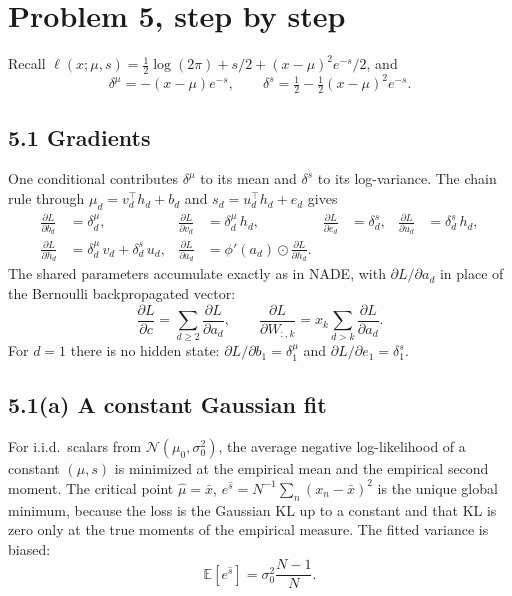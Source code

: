 \documentclass[11pt]{article}
\theoremstyle{remark}
\newcommand{\E}{\mathbb{E}}
\newcommand{\N}{\mathcal{N}}
\begin{document}
\newpage
\section{Problem 5, step by step}

Recall \(\ell(x;\mu,s)=\tfrac12\log(2\pi)+s/2+(x-\mu)^2 e^{-s}/2\), and
\[
\delta^\mu=-(x-\mu)e^{-s},\qquad
\delta^s=\tfrac12-\tfrac12(x-\mu)^2 e^{-s}.
\]

\subsection*{5.1 Gradients}

One conditional contributes \(\delta^\mu\) to its mean and \(\delta^s\) to its log-variance. The chain rule through \(\mu_d=v_d^\top h_d+b_d\) and \(s_d=u_d^\top h_d+e_d\) gives
\begin{align*}
\frac{\partial L}{\partial b_d}&=\delta^\mu_d, &
\frac{\partial L}{\partial v_d}&=\delta^\mu_d\,h_d, &
\frac{\partial L}{\partial e_d}&=\delta^s_d, &
\frac{\partial L}{\partial u_d}&=\delta^s_d\,h_d,\\
\frac{\partial L}{\partial h_d}&=\delta^\mu_d\,v_d+\delta^s_d\,u_d, &
\frac{\partial L}{\partial a_d}&=\phi'(a_d)\odot\frac{\partial L}{\partial h_d}.
\end{align*}
The shared parameters accumulate exactly as in NADE, with \(\partial L/\partial a_d\) in place of the Bernoulli backpropagated vector:
\[
\frac{\partial L}{\partial c}=\sum_{d\ge 2}\frac{\partial L}{\partial a_d},\qquad
\frac{\partial L}{\partial W_{:,k}}=x_k\sum_{d>k}\frac{\partial L}{\partial a_d}.
\]
For \(d=1\) there is no hidden state: \(\partial L/\partial b_1=\delta^\mu_1\) and \(\partial L/\partial e_1=\delta^s_1\).

\subsection*{5.1(a) A constant Gaussian fit}

For i.i.d.\ scalars from \(\N(\mu_0,\sigma_0^2)\), the average negative log-likelihood of a constant \((\mu,s)\) is minimized at the empirical mean and the empirical second moment. The critical point \(\hat\mu=\bar x\), \(e^{\hat s}=N^{-1}\sum_n(x_n-\bar x)^2\) is the unique global minimum, because the loss is the Gaussian KL up to a constant and that KL is zero only at the true moments of the empirical measure. The fitted variance is biased:
\[
\E[e^{\hat s}]=\sigma_0^2\frac{N-1}{N}.
\]
\end{document}

